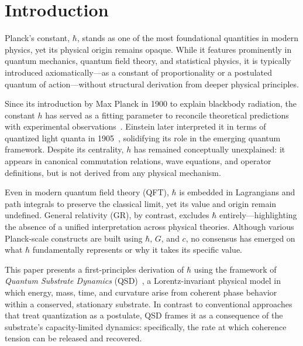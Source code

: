 \documentclass[ht-mathphys]{ht-fmt}
\theoremstyle{thmstyleone}%
\theoremstyle{thmstyletwo}%
\theoremstyle{thmstylethree}%
\begin{document}
\maketitle

\pagebreak
\section{Introduction}
\label{sec:introduction}

Planck’s constant, $\hbar$, stands as one of the most foundational quantities in modern physics, yet its physical origin remains opaque. While it features prominently in quantum mechanics, quantum field theory, and statistical physics, it is typically introduced axiomatically—as a constant of proportionality or a postulated quantum of action—without structural derivation from deeper physical principles.

Since its introduction by Max Planck in 1900 to explain blackbody radiation, the constant $h$ has served as a fitting parameter to reconcile theoretical predictions with experimental observations~\cite{planck1901}. Einstein later interpreted it in terms of quantized light quanta in 1905~\cite{einstein1905}, solidifying its role in the emerging quantum framework. Despite its centrality, $h$ has remained conceptually unexplained: it appears in canonical commutation relations, wave equations, and operator definitions, but is not derived from any physical mechanism.

Even in modern quantum field theory (QFT), $\hbar$ is embedded in Lagrangians and path integrals to preserve the classical limit, yet its value and origin remain undefined. General relativity (GR), by contrast, excludes $\hbar$ entirely—highlighting the absence of a unified interpretation across physical theories. Although various Planck-scale constructs are built using $\hbar$, $G$, and $c$, no consensus has emerged on what $\hbar$ fundamentally represents or why it takes its specific value.

This paper presents a first-principles derivation of $\hbar$ using the framework of \textit{Quantum Substrate Dynamics} (QSD)~\cite{bush2025}, a Lorentz-invariant physical model in which energy, mass, time, and curvature arise from coherent phase behavior within a conserved, stationary substrate. In contrast to conventional approaches that treat quantization as a postulate, QSD frames it as a consequence of the substrate’s capacity-limited dynamics: specifically, the rate at which coherence tension can be released and recovered.
\end{document}
